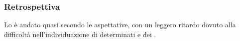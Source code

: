 \subsubsection{Retrospettiva}
Lo  è andato quasi secondo le aspettative, con un leggero ritardo dovuto alla difficoltà nell'individuazione di determinati  e dei .\\